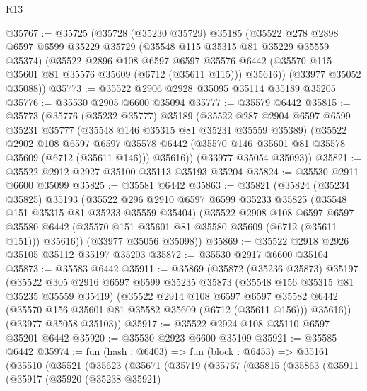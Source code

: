 \begin{lexlean}{R13}
\begin{coremodule}
@35767 := @35725
    (@35728
      (@35230 @35729)
      @35185
      (@35522
        @278
        @2898
        @6597
        @6599
        @35229
        @35729
        (@35548 @115 @35315 @81 @35229 @35559 @35374)
        (@35522
          @2896
          @108
          @6597
          @6597
          @35576
          @6442
          (@35570 @115 @35601 @81 @35576 @35609 (@6712 (@35611 @115)))
          @35616))
      (@33977 @35052 @35088))
@35773 := @35522 @2906 @2928 @35095 @35114 @35189 @35205
@35776 := @35530 @2905 @6600 @35094
@35777 := @35579 @6442
@35815 := @35773
    (@35776
      (@35232 @35777)
      @35189
      (@35522
        @287
        @2904
        @6597
        @6599
        @35231
        @35777
        (@35548 @146 @35315 @81 @35231 @35559 @35389)
        (@35522
          @2902
          @108
          @6597
          @6597
          @35578
          @6442
          (@35570 @146 @35601 @81 @35578 @35609 (@6712 (@35611 @146)))
          @35616))
      (@33977 @35054 @35093))
@35821 := @35522 @2912 @2927 @35100 @35113 @35193 @35204
@35824 := @35530 @2911 @6600 @35099
@35825 := @35581 @6442
@35863 := @35821
    (@35824
      (@35234 @35825)
      @35193
      (@35522
        @296
        @2910
        @6597
        @6599
        @35233
        @35825
        (@35548 @151 @35315 @81 @35233 @35559 @35404)
        (@35522
          @2908
          @108
          @6597
          @6597
          @35580
          @6442
          (@35570 @151 @35601 @81 @35580 @35609 (@6712 (@35611 @151)))
          @35616))
      (@33977 @35056 @35098))
@35869 := @35522 @2918 @2926 @35105 @35112 @35197 @35203
@35872 := @35530 @2917 @6600 @35104
@35873 := @35583 @6442
@35911 := @35869
    (@35872
      (@35236 @35873)
      @35197
      (@35522
        @305
        @2916
        @6597
        @6599
        @35235
        @35873
        (@35548 @156 @35315 @81 @35235 @35559 @35419)
        (@35522
          @2914
          @108
          @6597
          @6597
          @35582
          @6442
          (@35570 @156 @35601 @81 @35582 @35609 (@6712 (@35611 @156)))
          @35616))
      (@33977 @35058 @35103))
@35917 := @35522 @2924 @108 @35110 @6597 @35201 @6442
@35920 := @35530 @2923 @6600 @35109
@35921 := @35585 @6442
@35974 := fun (hash : @6403) =>
  fun (block : @6453) =>
  @35161
    (@35510
      (@35521
        (@35623
          (@35671
            (@35719
              (@35767
                (@35815
                  (@35863
                    (@35911
                      (@35917
                        (@35920
                          (@35238 @35921)

\end{coremodule}
\end{lexlean}
